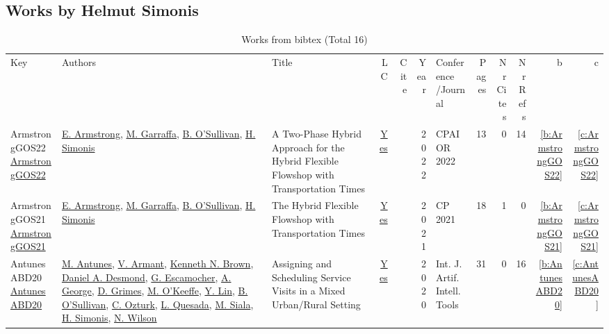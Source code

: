 \subsection{Works by Helmut Simonis}
\label{sec:a17}
{\scriptsize
\begin{longtable}{>{\raggedright\arraybackslash}p{3cm}>{\raggedright\arraybackslash}p{6cm}>{\raggedright\arraybackslash}p{6.5cm}rrrp{2.5cm}rrrrr}
\rowcolor{white}\caption{Works from bibtex (Total 16)}\\ \toprule
\rowcolor{white}Key & Authors & Title & LC & Cite & Year & \shortstack{Conference\\/Journal} & Pages & \shortstack{Nr\\Cites} & \shortstack{Nr\\Refs} & b & c \\ \midrule\endhead
\bottomrule
\endfoot
ArmstrongGOS22 \href{https://doi.org/10.1007/978-3-031-08011-1\_1}{ArmstrongGOS22} & \hyperref[auth:a14]{E. Armstrong}, \hyperref[auth:a15]{M. Garraffa}, \hyperref[auth:a16]{B. O'Sullivan}, \hyperref[auth:a17]{H. Simonis} & A Two-Phase Hybrid Approach for the Hybrid Flexible Flowshop with Transportation Times & \href{works/ArmstrongGOS22.pdf}{Yes} & \cite{ArmstrongGOS22} & 2022 & CPAIOR 2022 & 13 & 0 & 14 & \ref{b:ArmstrongGOS22} & \ref{c:ArmstrongGOS22}\\
ArmstrongGOS21 \href{https://doi.org/10.4230/LIPIcs.CP.2021.16}{ArmstrongGOS21} & \hyperref[auth:a14]{E. Armstrong}, \hyperref[auth:a15]{M. Garraffa}, \hyperref[auth:a16]{B. O'Sullivan}, \hyperref[auth:a17]{H. Simonis} & The Hybrid Flexible Flowshop with Transportation Times & \href{works/ArmstrongGOS21.pdf}{Yes} & \cite{ArmstrongGOS21} & 2021 & CP 2021 & 18 & 1 & 0 & \ref{b:ArmstrongGOS21} & \ref{c:ArmstrongGOS21}\\
AntunesABD20 \href{https://doi.org/10.1142/S0218213020600076}{AntunesABD20} & \hyperref[auth:a891]{M. Antunes}, \hyperref[auth:a892]{V. Armant}, \hyperref[auth:a223]{Kenneth N. Brown}, \hyperref[auth:a893]{Daniel A. Desmond}, \hyperref[auth:a894]{G. Escamocher}, \hyperref[auth:a895]{A. George}, \hyperref[auth:a183]{D. Grimes}, \hyperref[auth:a896]{M. O'Keeffe}, \hyperref[auth:a897]{Y. Lin}, \hyperref[auth:a16]{B. O'Sullivan}, \hyperref[auth:a898]{C. Ozturk}, \hyperref[auth:a899]{L. Quesada}, \hyperref[auth:a130]{M. Siala}, \hyperref[auth:a17]{H. Simonis}, \hyperref[auth:a838]{N. Wilson} & Assigning and Scheduling Service Visits in a Mixed Urban/Rural Setting & \href{works/AntunesABD20.pdf}{Yes} & \cite{AntunesABD20} & 2020 & Int. J. Artif. Intell. Tools & 31 & 0 & 16 & \ref{b:AntunesABD20} & \ref{c:AntunesABD20}\\

\end{longtable}}

